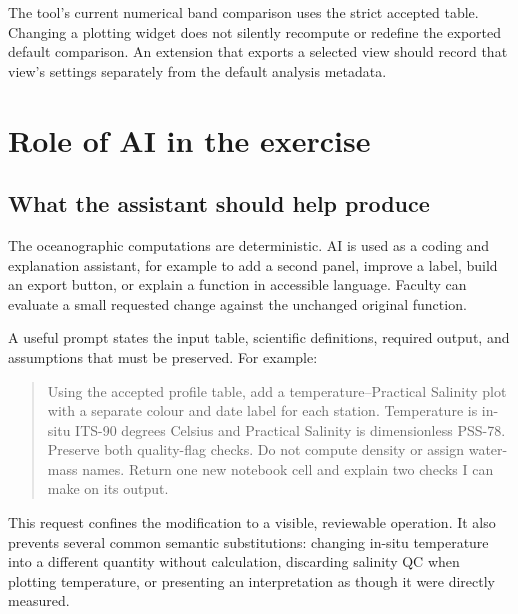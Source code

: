 \documentclass[11pt,letterpaper]{article}
\begin{document}
The tool's current numerical band comparison uses the strict accepted table. Changing a plotting widget does not silently recompute or redefine the exported default comparison. An extension that exports a selected view should record that view's settings separately from the default analysis metadata.

\section{Role of AI in the exercise}
\label{sec:ai}

\subsection{What the assistant should help produce}
The oceanographic computations are deterministic. AI is used as a coding and explanation assistant, for example to add a second panel, improve a label, build an export button, or explain a function in accessible language. Faculty can evaluate a small requested change against the unchanged original function.

A useful prompt states the input table, scientific definitions, required output, and assumptions that must be preserved. For example:
\begin{quote}
Using the accepted profile table, add a temperature--Practical Salinity plot with a separate colour and date label for each station. Temperature is in-situ ITS-90 degrees Celsius and Practical Salinity is dimensionless PSS-78. Preserve both quality-flag checks. Do not compute density or assign water-mass names. Return one new notebook cell and explain two checks I can make on its output.
\end{quote}

This request confines the modification to a visible, reviewable operation. It also prevents several common semantic substitutions: changing in-situ temperature into a different quantity without calculation, discarding salinity QC when plotting temperature, or presenting an interpretation as though it were directly measured.
\end{document}
